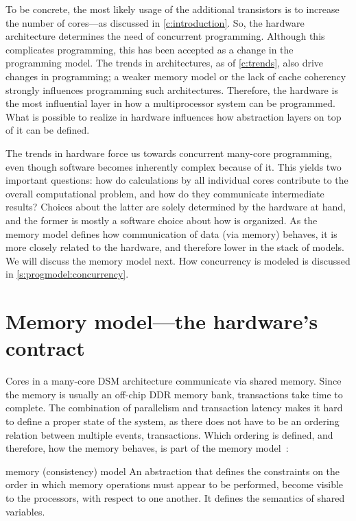To be concrete, the most likely usage of the additional transistors is to increase the number of cores---as discussed in \cref{c:introduction}.
So, the hardware architecture determines the need of concurrent programming.
Although this complicates programming, this has been accepted as a change in the programming model.
The trends in  architectures, as of \cref{c:trends}, also drive changes in programming; a weaker memory model or the lack of cache coherency strongly influences programming such architectures.
Therefore, the hardware is the most influential layer in how a multiprocessor system can be programmed.
What is possible to realize in hardware influences how abstraction layers on top of it can be defined.

The trends in hardware force us towards concurrent many-core programming, even though software becomes inherently complex because of it.
This yields two important questions:
how do calculations by all individual cores contribute to the overall computational problem, and
how do they communicate intermediate results?
Choices about the latter are solely determined by the hardware at hand, and the former is mostly a software choice about how  is organized.
As the memory model defines how communication of data (via memory) behaves, it is more closely related to the hardware, and therefore lower in the stack of models.
We will discuss the memory model next.
How concurrency is modeled is discussed in \cref{s:progmodel:concurrency}.


\section{Memory model---the hardware's contract}
\label{s:progmodel:memory}

Cores in a many-core \ac{DSM} architecture communicate via shared memory.
Since the memory is usually an off-chip \ac{DDR} memory bank, transactions take time to complete.
The combination of parallelism and transaction latency makes it hard to define a proper state of the system, as there does not have to be an ordering relation between multiple events, \ie transactions.
Which ordering is defined, and therefore, how the memory behaves, is part of the memory model~\cite{culler:comp_arch,adve:rethinking}:
\begin{describe}{memory (consistency) model}
	An abstraction that defines the constraints on the order in which memory operations must appear to be performed, \ie become visible to the processors, with respect to one another.
	It defines the semantics of shared variables.
\end{describe}


